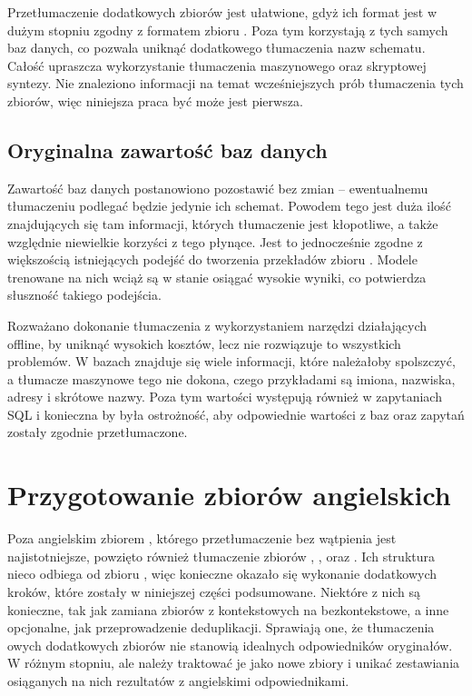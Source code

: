 Przetłumaczenie dodatkowych zbiorów jest ułatwione, gdyż ich format jest w dużym stopniu zgodny z formatem zbioru . Poza tym korzystają z tych samych baz danych, co pozwala uniknąć dodatkowego tłumaczenia nazw schematu. Całość upraszcza wykorzystanie tłumaczenia maszynowego oraz skryptowej syntezy. Nie znaleziono informacji na temat wcześniejszych prób tłumaczenia tych zbiorów, więc niniejsza praca być może jest pierwsza.

\subsection{Oryginalna zawartość baz danych}
Zawartość baz danych postanowiono pozostawić bez zmian -- ewentualnemu tłumaczeniu podlegać będzie jedynie ich schemat. Powodem tego jest duża ilość znajdujących się tam informacji, których tłumaczenie jest kłopotliwe, a także względnie niewielkie korzyści z tego płynące. Jest to jednocześnie zgodne z większością istniejących podejść do tworzenia przekładów zbioru . Modele trenowane na nich wciąż są w stanie osiągać wysokie wyniki, co potwierdza słuszność takiego podejścia.

Rozważano dokonanie tłumaczenia z wykorzystaniem narzędzi działających offline, by uniknąć wysokich kosztów, lecz nie rozwiązuje to wszystkich problemów. W bazach znajduje się wiele informacji, które należałoby spolszczyć, a tłumacze maszynowe tego nie dokona, czego przykładami są imiona, nazwiska, adresy i skrótowe nazwy. Poza tym wartości występują również w zapytaniach SQL i konieczna by była ostrożność, aby odpowiednie wartości z baz oraz zapytań zostały zgodnie przetłumaczone.

\section{Przygotowanie zbiorów angielskich}
Poza angielskim zbiorem , którego przetłumaczenie bez wątpienia jest najistotniejsze, powzięto również tłumaczenie zbiorów , ,  oraz . Ich struktura nieco odbiega od zbioru , więc konieczne okazało się wykonanie dodatkowych kroków, które zostały w niniejszej części podsumowane. Niektóre z nich są konieczne, tak jak zamiana zbiorów z kontekstowych na bezkontekstowe, a inne opcjonalne, jak przeprowadzenie deduplikacji. Sprawiają one, że tłumaczenia owych dodatkowych zbiorów nie stanowią idealnych odpowiedników oryginałów. W różnym stopniu, ale należy traktować je jako nowe zbiory i unikać zestawiania osiąganych na nich rezultatów z angielskimi odpowiednikami.

